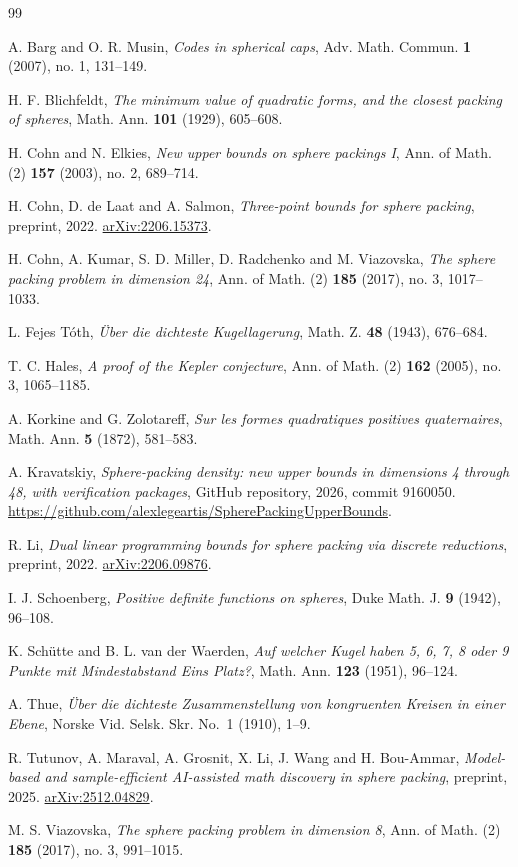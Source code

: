 \documentclass[11pt]{amsart}
\numberwithin{equation}{section}
\theoremstyle{remark}
\begin{document}
\begin{thebibliography}{99}

A. Barg and O. R. Musin, \emph{Codes in spherical caps}, Adv. Math. Commun. \textbf{1} (2007), no. 1, 131--149.

H. F. Blichfeldt, \emph{The minimum value of quadratic forms, and the closest packing of spheres}, Math. Ann. \textbf{101} (1929), 605--608.

H. Cohn and N. Elkies, \emph{New upper bounds on sphere packings I}, Ann. of Math. (2) \textbf{157} (2003), no. 2, 689--714.

H. Cohn, D. de Laat and A. Salmon, \emph{Three-point bounds for sphere packing}, preprint, 2022. \href{https://arxiv.org/abs/2206.15373}{arXiv:2206.15373}.

H. Cohn, A. Kumar, S. D. Miller, D. Radchenko and M. Viazovska, \emph{The sphere packing problem in dimension 24}, Ann. of Math. (2) \textbf{185} (2017), no. 3, 1017--1033.

L. Fejes T\'oth, \emph{\"Uber die dichteste Kugellagerung}, Math. Z. \textbf{48} (1943), 676--684.

T. C. Hales, \emph{A proof of the Kepler conjecture}, Ann. of Math. (2) \textbf{162} (2005), no. 3, 1065--1185.

A. Korkine and G. Zolotareff, \emph{Sur les formes quadratiques positives quaternaires}, Math. Ann. \textbf{5} (1872), 581--583.

A. Kravatskiy, \emph{Sphere-packing density: new upper bounds in dimensions 4 through 48, with verification packages}, GitHub repository, 2026, commit 9160050. \url{https://github.com/alexlegeartis/SpherePackingUpperBounds}.

R. Li, \emph{Dual linear programming bounds for sphere packing via discrete reductions}, preprint, 2022. \href{https://arxiv.org/abs/2206.09876}{arXiv:2206.09876}.

I. J. Schoenberg, \emph{Positive definite functions on spheres}, Duke Math. J. \textbf{9} (1942), 96--108.

K. Schütte and B. L. van der Waerden, \emph{Auf welcher Kugel haben 5, 6, 7, 8 oder 9 Punkte mit Mindestabstand Eins Platz?}, Math. Ann. \textbf{123} (1951), 96--124.

A. Thue, \emph{\"Uber die dichteste Zusammenstellung von kongruenten Kreisen in einer Ebene}, Norske Vid. Selsk. Skr. No.~1 (1910), 1--9.

R. Tutunov, A. Maraval, A. Grosnit, X. Li, J. Wang and H. Bou-Ammar, \emph{Model-based and sample-efficient AI-assisted math discovery in sphere packing}, preprint, 2025. \href{https://arxiv.org/abs/2512.04829}{arXiv:2512.04829}.

M. S. Viazovska, \emph{The sphere packing problem in dimension 8}, Ann. of Math. (2) \textbf{185} (2017), no. 3, 991--1015.

\end{thebibliography}
\end{document}
